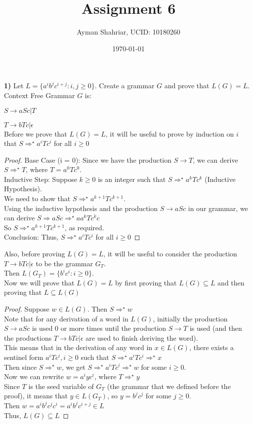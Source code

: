 \documentclass{article}
\title{Assignment 6}
\author{Ayman Shahriar, UCID: 10180260}
\date{\today}
\begin{document}
\maketitle

\textbf{1)} Let $L = \{a^i b^j c^{i+j} : i, j \ge 0 \}$. Create a grammar $G$ and prove that $L(G) = L$.\\
Context Free Grammar $G$ is:

$S \rightarrow aSc | T$

$T \rightarrow bTc | \epsilon$\\ 
Before we prove that $L(G) = L$, it will be useful to prove by induction on $i$ that $S \Rightarrow^\star a^iTc^i$ for all $i \ge 0$
\begin{proof}
Base Case (i = 0): Since we have the production $S \rightarrow T$, we can derive $S \Rightarrow^\star T$, where $T = a^0Tc^0$.\\
Inductive Step: Suppose $k \ge 0$ is an integer such that $S \Rightarrow^\star a^kTc^k$ (Inductive Hypothesis).\\
We need to show that $S \Rightarrow^\star a^{k+1}Tc^{k+1}$.\\
Using the inductive hypothesis and the production $S \rightarrow aSc$ in our grammar, we can derive $S \Rightarrow aSc \Rightarrow^\star aa^kTc^kc$\\
So $S \Rightarrow^\star a^{k+1}Tc^{k+1}$, as required.\\
Conclusion: Thus, $S \Rightarrow^\star a^iTc^i$ for all $i \ge 0$
\end{proof} 
Also, before proving $L(G) = L$, it will be useful to consider the production $T \rightarrow bTc | \epsilon $ to be the grammar $G_T$.\\
\medskip
Then $L(G_T) = \{b^ic^i: i \ge 0\}$.\\
Now we will prove that $L(G) = L$ by first proving that $L(G) \subseteq L$ and then proving that $L \subseteq L(G)$
\begin{proof}
Suppose $w \in L(G)$. Then $S \Rightarrow^\star w$\\
Note that for any derivation of a word in $L(G)$, initially the production  $S \rightarrow aSc$ is used 0 or more times until the production $S \rightarrow T$ is used (and then the productions  $T \rightarrow bTc|\epsilon$ are used to finish deriving the word).\\
This means that in the derivation of any word in $x \in L(G)$, there exists a sentinel form $a^iTc^i, i \ge 0$ such that $S \Rightarrow^\star a^iTc^i \Rightarrow^\star x$\\
Then since $S \Rightarrow^\star w$, we get $S \Rightarrow^\star a^iTc^i \Rightarrow^\star w$ for some $i \ge 0$.\\
Now we can rewrite $w = a^iyc^i$, where $T \Rightarrow^\star y$\\
Since $T$ is the seed variable of $G_T$ (the grammar that we defined before the proof), it means that $y \in L(G_T)$, so $y = b^jc^j$ for some $j \ge 0$.\\
Then $w = a^ib^jc^jc^i = a^ib^jc^{i+j} \in L$\\
Thus, $L(G) \subseteq L$
\end{proof}
\end{document}
